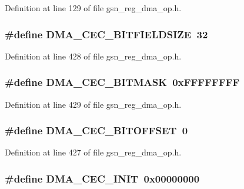 Definition at line 129 of file gsn\_\-reg\_\-dma\_\-op.h.

\hypertarget{a00547_a9562638fe2d229b2a5e35ad6f6a1f059}{
\subsubsection[{DMA\_\-CEC\_\-BITFIELDSIZE}]{\setlength{\rightskip}{0pt plus 5cm}\#define DMA\_\-CEC\_\-BITFIELDSIZE~32}}
\label{a00547_a9562638fe2d229b2a5e35ad6f6a1f059}


Definition at line 428 of file gsn\_\-reg\_\-dma\_\-op.h.

\hypertarget{a00547_a5e6dc4ed79f7cb0e5d5d23c37e6838d8}{
\subsubsection[{DMA\_\-CEC\_\-BITMASK}]{\setlength{\rightskip}{0pt plus 5cm}\#define DMA\_\-CEC\_\-BITMASK~0xFFFFFFFF}}
\label{a00547_a5e6dc4ed79f7cb0e5d5d23c37e6838d8}


Definition at line 429 of file gsn\_\-reg\_\-dma\_\-op.h.

\hypertarget{a00547_a80f794076518f1e4fce55dd2600392e8}{
\subsubsection[{DMA\_\-CEC\_\-BITOFFSET}]{\setlength{\rightskip}{0pt plus 5cm}\#define DMA\_\-CEC\_\-BITOFFSET~0}}
\label{a00547_a80f794076518f1e4fce55dd2600392e8}


Definition at line 427 of file gsn\_\-reg\_\-dma\_\-op.h.

\hypertarget{a00547_a22414a3b0c649c6daa0829a9dd7701ff}{
\subsubsection[{DMA\_\-CEC\_\-INIT}]{\setlength{\rightskip}{0pt plus 5cm}\#define DMA\_\-CEC\_\-INIT~0x00000000}}
\label{a00547_a22414a3b0c649c6daa0829a9dd7701ff}


